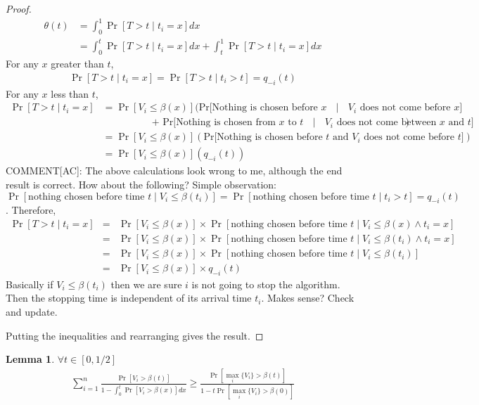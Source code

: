 \documentclass[10pt, letterpaper, twoside]{article}
\newtheorem{lemma}[theorem]{Lemma}
\begin{document}
	\begin{proof}
		\begin{align*}
			\theta(t) &= \int_{0}^{1} \Pr[T > t \mid t_{i} = x] dx\\
			&= \int_{0}^{t} \Pr[T > t \mid t_{i} = x] dx + \int_{t}^{1} \Pr[T > t \mid t_{i} = x] dx
		\end{align*}
		For any $x$ greater than $t$,
		\begin{align*}
			\Pr[T > t \mid t_{i} = x] = \Pr[T > t \mid t_{i} > t] = q_{-i}(t)
		\end{align*}
		For any $x$ less than $t$,
		\begin{align*}
			\Pr[T > t \mid t_{i} = x] &= \Pr[V_{i} \leq \beta(x)] (\text{Pr[Nothing is chosen before $x$ $\mid$ $V_{i}$ does not come before $x$]} \\
			&\quad \quad \quad \quad \quad \text{+ Pr[Nothing is chosen from $x$ to $t$ $\mid$ $V_{i}$ does not come between $x$ and $t$]})\\
			&= \Pr[V_{i} \leq \beta(x)](\text{Pr[Nothing is chosen before $t$ and $V_{i}$ does not come before $t$]})\\
			&= \Pr[V_{i} \leq \beta(x)] (q_{-i}(t))
		\end{align*}
COMMENT[AC]: The above calculations look wrong to me, although the end result is correct. How about the following?
Simple observation: $\Pr[\text{nothing chosen before time }t \mid V_i\leq\beta(t_i)]=\Pr[\text{nothing chosen before time }t \mid t_i>t]=q_{-i}(t)$. Therefore,
\begin{eqnarray*}
\Pr[T > t \mid t_{i} = x] & = & \Pr[V_{i} \leq \beta(x)] \times \Pr[\text{nothing chosen before time }t \mid V_{i} \leq \beta(x) \wedge t_{i} = x]\\
 & = & \Pr[V_{i} \leq \beta(x)] \times \Pr[\text{nothing chosen before time }t \mid V_{i} \leq \beta(t_i) \wedge t_{i} = x]\\
 & = & \Pr[V_{i} \leq \beta(x)] \times \Pr[\text{nothing chosen before time }t \mid V_{i} \leq \beta(t_i)]\\
 & = & \Pr[V_{i} \leq \beta(x)] \times q_{-i}(t)
\end{eqnarray*}
Basically if $V_{i} \leq \beta(t_i)$ then we are sure $i$ is not going to stop the algorithm. Then the stopping time is independent of its arrival time $t_i$. Makes sense? Check and update.

		Putting the inequalities and rearranging gives the result.
	\end{proof}
\begin{lemma}
$\forall t \in [0,1/2]$
	\begin{align*}
		\sum_{i=1}^{n} \frac{\Pr[V_{i}>\beta(t)]}{1-\int_{0}^{t} \Pr[V_{i}>\beta(x)] dx} \geq \frac{\Pr[\max_{i} \{V_{i}\} > \beta(t)]}{1-t\Pr[\max_{i} \{V_{i}\} > \beta(0)]}
	\end{align*}
\end{lemma}
\end{document}

